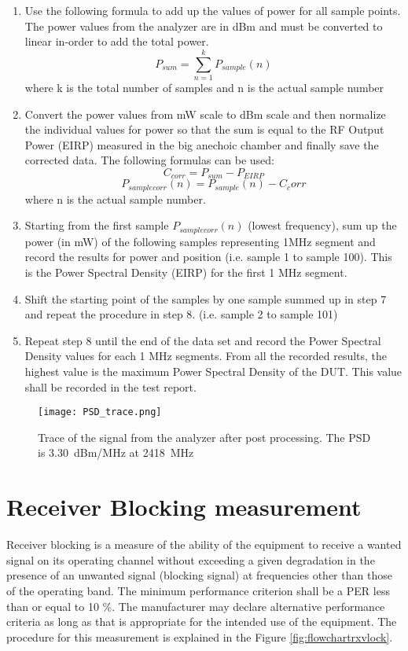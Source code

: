 \begin{enumerate}
 
 \item Use the following formula to add up the values of power for all sample points. The power values from the analyzer are in dBm and must be converted to linear in-order to add the total power.
  $$ P_{sum} = \sum_{n=1}^{k} P_{sample}(n) $$ where k is the total number of samples and n is the actual sample number
  
 \item  Convert the power values from mW scale to dBm scale and then normalize the individual values for power so that the sum is equal to the \acs{RF} Output Power (\acs{EIRP}) measured in the big anechoic chamber and finally save the corrected data. The following formulas can be used:
  $$C_{corr} = P_{sum} - P_{EIRP}   $$ 
  $$P_{samplecorr}(n) = P_{sample}(n) - C_corr $$ where n is the actual sample number.
  
  \item Starting from the first sample $P_{samplecorr}(n)$ (lowest frequency), sum up the power (in mW) of the following samples representing 1MHz segment and record the results for power and position (i.e. sample 1 to sample 100). This is the Power Spectral Density (\acs{EIRP}) for the first 1 MHz segment.
  
  \item Shift the starting point of the samples by one sample summed up in step 7 and repeat the procedure in step 8. (i.e. sample 2 to sample 101)
  
  \item Repeat step 8 until the end of the data set and record the Power Spectral Density values for each 1 MHz segments. From all the recorded results, the highest value is the maximum Power Spectral Density of the \acs{DUT}. This value shall be recorded in the test report.
    \end{enumerate}
  
 \begin{figure}[H]
\centering
\texttt{[image: PSD\_trace.png]}
\caption{Trace of the signal from the analyzer after post processing. The \acs{PSD} is 3.30~dBm/MHz at 2418~MHz}
\label{fig:psdtraceI}
\end{figure}
  
  
 \section{Receiver Blocking measurement}
\label{sec:rxmeas} 
Receiver blocking is a measure of the ability of the equipment to receive a wanted signal on its operating channel without exceeding a given degradation in the presence of an unwanted signal (blocking signal) at frequencies other than those of the operating band. The minimum performance criterion shall be a \ac{PER} less than or equal to 10 \%. The manufacturer may declare alternative performance criteria as long as that is appropriate for the intended use of the equipment. The procedure for this measurement is explained in the Figure \ref{fig:flowchartrxvlock}.

